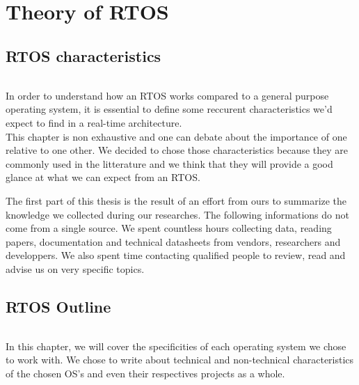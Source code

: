 \part{Theory of RTOS}

\chapter{RTOS characteristics}

\paragraph{}
In order to understand how an RTOS works compared to a general purpose operating system,
    it is essential to define some reccurent characteristics we'd expect to find in a real-time architecture.
\\
This chapter is non exhaustive and one can debate about the importance of one relative to one other.
We decided to chose those characteristics because they are commonly used in the litterature
    and we think that they will provide a good glance at what we can expect from an RTOS.

The first part of this thesis is the result of an effort from ours to summarize the knowledge we collected during our researches.
The following informations do not come from a single source.
We spent countless hours collecting data, reading papers, documentation and technical datasheets from vendors, researchers and developpers.
We also spent time contacting qualified people to review, read and advise us on very specific topics.










\chapter{RTOS Outline}

\paragraph{}
In this chapter, we will cover the specificities of each operating system we chose to work with.
We chose to write about technical and non-technical characteristics of the chosen OS's and even their respectives projects as a whole.

